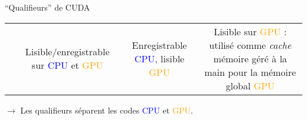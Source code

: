 \documentclass{beamer}
\begin{document}
\begin{frame}{``Qualifieurs'' de CUDA}
{\begin{tabular}{c|ccc}
    & \begin{minipage}{25mm}
      Lisible/enregistrable sur \textcolor{blue}{CPU} et \textcolor{orange}{GPU}
    \end{minipage} &
    \begin{minipage}{25mm}
      Enregistrable \textcolor{blue}{CPU}, lisible \textcolor{orange}{GPU}
    \end{minipage} &
    \begin{minipage}{25mm}
      Lisible sur \textcolor{orange}{GPU} : utilisé comme \textsl{cache} mémoire géré à la main
      pour la mémoire global \textcolor{orange}{GPU}
    \end{minipage}
  \end{tabular}
}
$\rightarrow$ Les qualifieurs séparent les codes \textcolor{blue}{CPU} et \textcolor{orange}{GPU}.
\end{frame}
\end{document}
